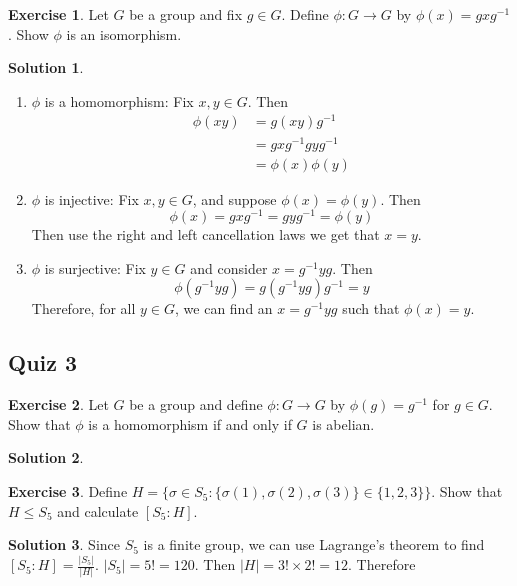 \documentclass[12pt]{article}
\theoremstyle{definition}
\newtheorem{exercise}{Exercise}
\theoremstyle{definition}
\newtheorem{solution}{Solution}
\begin{document}
\begin{exercise}
Let $G$ be a group and fix $g \in G$. Define $\phi : G \to G$ by $\phi(x) = gxg^{-1}$. Show $\phi$ is an isomorphism.
\end{exercise}
\begin{solution}
\begin{enumerate}
	\item $\phi$ is a homomorphism: Fix $x, y \in G$. Then
	\begin{align*}
	\phi(xy) &= g (xy) g^{-1} \\
	&= g x g^{-1} g y g^{-1} \\
	&= \phi(x) \phi(y)
	\end{align*}
	\item $\phi$ is injective: Fix $x, y \in G$, and suppose $\phi(x)=\phi(y)$. Then
	\begin{equation}
		\phi(x) = g x g^{-1} = g y g^{-1} = \phi(y) 
	\end{equation}
	Then use the right and left cancellation laws we get that $x = y$.
	\item $\phi$ is surjective: Fix $y \in G$ and consider $x = g^{-1} y g$. Then
	\begin{equation}
		\phi(g^{-1}yg) = g (g^{-1}yg) g^{-1} = y
	\end{equation}
	Therefore, for all $y \in G$, we can find an $x = g^{-1} y g$ such that $\phi(x) = y$.
\end{enumerate}
\end{solution}

\subsection{Quiz 3}
\begin{exercise}
Let $G$ be a group and define $\phi : G \to G$ by $\phi(g) = g^{-1}$ for $g \in G$. Show that $\phi$ is a homomorphism if and only if $G$ is abelian.
\end{exercise}
\begin{solution}

\end{solution}

\begin{exercise}
Define $H = \{\sigma \in S_5 : \{\sigma(1), \sigma(2), \sigma(3) \} \in \{ 1, 2, 3 \} \}$. Show that $H \leq S_5$ and calculate $[S_5 : H]$. 
\end{exercise}
\begin{solution}

Since $S_5$ is a finite group, we can use Lagrange's theorem to find $[S_5 : H] = \frac{|S_5|}{|H|}$.  $|S_5| = 5! = 120$. Then $|H| = 3! \times 2! = 12$. Therefore 
\end{solution}
\end{document}
